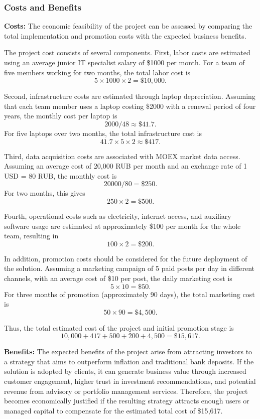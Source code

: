 \documentclass[oneside,final,12pt,a4paper]{extreport}
\begin{document}
\subsubsection{Costs and Benefits}
\textbf{Costs:} The economic feasibility of the project can be assessed by comparing the total implementation and promotion costs with the expected business benefits.

The project cost consists of several components. First, labor costs are estimated using an average junior IT specialist salary of \$1000 per month. For a team of five members working for two months, the total labor cost is
\[
5 \times 1000 \times 2 = \$10{,}000.
\]

Second, infrastructure costs are estimated through laptop depreciation. Assuming that each team member uses a laptop costing \$2000 with a renewal period of four years, the monthly cost per laptop is
\[
2000 / 48 \approx \$41.7.
\]
For five laptops over two months, the total infrastructure cost is
\[
41.7 \times 5 \times 2 \approx \$417.
\]

Third, data acquisition costs are associated with MOEX market data access. Assuming an average cost of 20{,}000 RUB per month and an exchange rate of 1 USD = 80 RUB, the monthly cost is
\[
20000 / 80 = \$250.
\]
For two months, this gives
\[
250 \times 2 = \$500.
\]

Fourth, operational costs such as electricity, internet access, and auxiliary software usage are estimated at approximately \$100 per month for the whole team, resulting in
\[
100 \times 2 = \$200.
\]

In addition, promotion costs should be considered for the future deployment of the solution. Assuming a marketing campaign of 5 paid posts per day in different channels, with an average cost of \$10 per post, the daily marketing cost is
\[
5 \times 10 = \$50.
\]
For three months of promotion (approximately 90 days), the total marketing cost is
\[
50 \times 90 = \$4{,}500.
\]

Thus, the total estimated cost of the project and initial promotion stage is
\[
10{,}000 + 417 + 500 + 200 + 4{,}500 = \$15{,}617.
\]

\textbf{Benefits:} The expected benefits of the project arise from attracting investors to a strategy that aims to outperform inflation and traditional bank deposits. If the solution is adopted by clients, it can generate business value through increased customer engagement, higher trust in investment recommendations, and potential revenue from advisory or portfolio management services. Therefore, the project becomes economically justified if the resulting strategy attracts enough users or managed capital to compensate for the estimated total cost of \$15{,}617.
\end{document}
